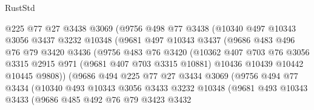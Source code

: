 \begin{lexlean}{RustStd}
\begin{coremodule}
                    @225
                    @77
                    @27
                    @3438
                    @3069
                    (@9756
                      @498
                      @77
                      @3438
                      (@10340
                        @497
                        @10343
                        @3056
                        @3437
                        @3232
                        @10348
                        (@9681
                          @497
                          @10343
                          @3437
                          (@9686
                            @483
                            @496
                            @76
                            @79
                            @3420
                            @3436
                            (@9756
                              @483
                              @76
                              @3420
                              (@10362
                                @407
                                @703
                                @76
                                @3056
                                @3315
                                @2915
                                @971
                                (@9681 @407 @703 @3315 @10881)
                                @10436
                                @10439
                                @10442
                                @10445
                                @9808))
                            (@9686
                              @494
                              @225
                              @77
                              @27
                              @3434
                              @3069
                              (@9756
                                @494
                                @77
                                @3434
                                (@10340
                                  @493
                                  @10343
                                  @3056
                                  @3433
                                  @3232
                                  @10348
                                  (@9681
                                    @493
                                    @10343
                                    @3433
                                    (@9686
                                      @485
                                      @492
                                      @76
                                      @79
                                      @3423
                                      @3432

\end{coremodule}
\end{lexlean}
